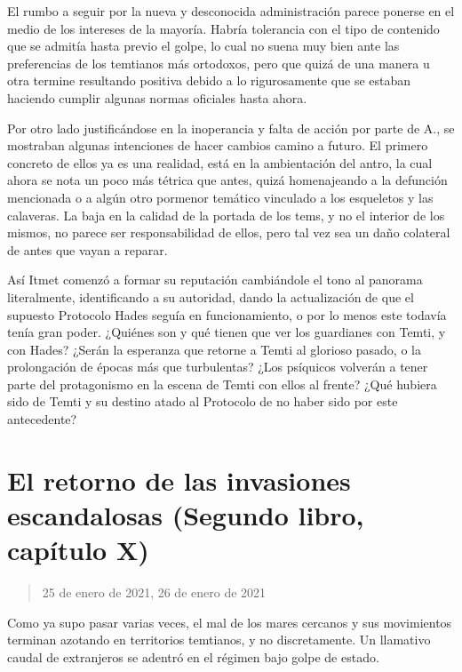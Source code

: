 \documentclass[
  spanish,
]{book}
\begin{document}
El rumbo a seguir por la nueva y desconocida administración parece ponerse en el medio de los intereses de la mayoría. Habría tolerancia con el tipo de contenido que se admitía hasta previo el golpe, lo cual no suena muy bien ante las preferencias de los temtianos más ortodoxos, pero que quizá de una manera u otra termine resultando positiva debido a lo rigurosamente que se estaban haciendo cumplir algunas normas oficiales hasta ahora.

Por otro lado justificándose en la inoperancia y falta de acción por parte de A., se mostraban algunas intenciones de hacer cambios camino a futuro. El primero concreto de ellos ya es una realidad, está en la ambientación del antro, la cual ahora se nota un poco más tétrica que antes, quizá homenajeando a la defunción mencionada o a algún otro pormenor temático vinculado a los esqueletos y las calaveras. La baja en la calidad de la portada de los tems, y no el interior de los mismos, no parece ser responsabilidad de ellos, pero tal vez sea un daño colateral de antes que vayan a reparar.

Así Itmet comenzó a formar su reputación cambiándole el tono al panorama literalmente, identificando a su autoridad, dando la actualización de que el supuesto Protocolo Hades seguía en funcionamiento, o por lo menos este todavía tenía gran poder. ¿Quiénes son y qué tienen que ver los guardianes con Temti, y con Hades? ¿Serán la esperanza que retorne a Temti al glorioso pasado, o la prolongación de épocas más que turbulentas? ¿Los psíquicos volverán a tener parte del protagonismo en la escena de Temti con ellos al frente? ¿Qué hubiera sido de Temti y su destino atado al Protocolo de no haber sido por este antecedente?

\hypertarget{el-retorno-de-las-invasiones-escandalosas-segundo-libro-capuxedtulo-x}{%
\section{El retorno de las invasiones escandalosas (Segundo libro, capítulo X)}\label{el-retorno-de-las-invasiones-escandalosas-segundo-libro-capuxedtulo-x}}

\begin{quote}
25 de enero de 2021, 26 de enero de 2021
\end{quote}

Como ya supo pasar varias veces, el mal de los mares cercanos y sus movimientos terminan azotando en territorios temtianos, y no discretamente. Un llamativo caudal de extranjeros se adentró en el régimen bajo golpe de estado.
\end{document}
